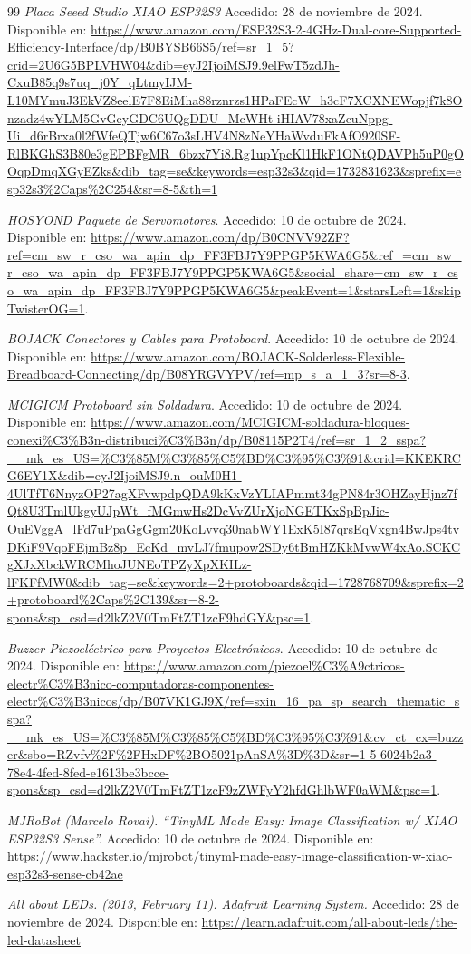 \begin{thebibliography}{99}
    \textit{Placa Seeed Studio XIAO ESP32S3} Accedido: 28 de noviembre de 2024. Disponible en: \url{https://www.amazon.com/ESP32S3-2-4GHz-Dual-core-Supported-Efficiency-Interface/dp/B0BYSB66S5/ref=sr_1_5?crid=2U6G5BPLVHW04&dib=eyJ2IjoiMSJ9.9elFwT5zdJh-CxuB85q9s7uq_j0Y_qLtmyIJM-L10MYmuJ3EkVZ8eelE7F8EiMha88rznrzs1HPaFEcW_h3cF7XCXNEWopjf7k8Onzadz4wYLM5GvGeyGDC6UQgDDU_McWHt-iHIAV78xaZcuNppg-Ui_d6rBrxa0l2fWfeQTjw6C67o3sLHV4N8zNeYHaWvduFkAfO920SF-RlBKGhS3B80e3gEPBFgMR_6bzx7Yi8.Rg1upYpcKl1HkF1ONtQDAVPh5uP0gOOqpDmqXGyEZks&dib_tag=se&keywords=esp32s3&qid=1732831623&sprefix=esp32s3%2Caps%2C254&sr=8-5&th=1}

    \textit{HOSYOND Paquete de Servomotores}. Accedido: 10 de octubre de 2024. Disponible en: \url{https://www.amazon.com/dp/B0CNVV92ZF?ref=cm_sw_r_cso_wa_apin_dp_FF3FBJ7Y9PPGP5KWA6G5&ref_=cm_sw_r_cso_wa_apin_dp_FF3FBJ7Y9PPGP5KWA6G5&social_share=cm_sw_r_cso_wa_apin_dp_FF3FBJ7Y9PPGP5KWA6G5&peakEvent=1&starsLeft=1&skipTwisterOG=1}.

    \textit{BOJACK Conectores y Cables para Protoboard}. Accedido: 10 de octubre de 2024. Disponible en: \url{https://www.amazon.com/BOJACK-Solderless-Flexible-Breadboard-Connecting/dp/B08YRGVYPV/ref=mp_s_a_1_3?sr=8-3}.

    \textit{MCIGICM Protoboard sin Soldadura}. Accedido: 10 de octubre de 2024. Disponible en: \url{https://www.amazon.com/MCIGICM-soldadura-bloques-conexi%C3%B3n-distribuci%C3%B3n/dp/B08115P2T4/ref=sr_1_2_sspa?__mk_es_US=%C3%85M%C3%85%C5%BD%C3%95%C3%91&crid=KKEKRCG6EY1X&dib=eyJ2IjoiMSJ9.n_ouM0H1-4UlTfT6NnyzOP27agXFvwpdpQDA9kKxVzYLIAPmmt34gPN84r3OHZayHjnz7fQt8U3TmlUkgyUJpWt_fMGmwHs2DcVvZUrXjoNGETKxSpBpJic-OuEVggA_lFd7uPpaGgGgm20KoLvvq30nabWY1ExK5I87qrsEqVxgn4BwJps4tvDKiF9VqoFEjmBz8p_EcKd_mvLJ7fmupow2SDy6tBmHZKkMvwW4xAo.SCKCgXJxXbckWRCMhoJUNEoTPZyXpXKILz-lFKFfMW0&dib_tag=se&keywords=2+protoboards&qid=1728768709&sprefix=2+protoboard%2Caps%2C139&sr=8-2-spons&sp_csd=d2lkZ2V0TmFtZT1zcF9hdGY&psc=1}.

    \textit{Buzzer Piezoeléctrico para Proyectos Electrónicos}. Accedido: 10 de octubre de 2024. Disponible en: \url{https://www.amazon.com/piezoel%C3%A9ctricos-electr%C3%B3nico-computadoras-componentes-electr%C3%B3nicos/dp/B07VK1GJ9X/ref=sxin_16_pa_sp_search_thematic_sspa?__mk_es_US=%C3%85M%C3%85%C5%BD%C3%95%C3%91&cv_ct_cx=buzzer&sbo=RZvfv%2F%2FHxDF%2BO5021pAnSA%3D%3D&sr=1-5-6024b2a3-78e4-4fed-8fed-e1613be3bcce-spons&sp_csd=d2lkZ2V0TmFtZT1zcF9zZWFyY2hfdGhlbWF0aWM&psc=1}.

    \textit{MJRoBot (Marcelo Rovai). “TinyML Made Easy: Image Classification w/ XIAO ESP32S3 Sense”.} Accedido: 10 de octubre de 2024. Disponible en: \url{https://www.hackster.io/mjrobot/tinyml-made-easy-image-classification-w-xiao-esp32s3-sense-cb42ae}

    \textit{All about LEDs. (2013, February 11). Adafruit Learning System.} Accedido: 28 de noviembre de 2024. Disponible en: \url{https://learn.adafruit.com/all-about-leds/the-led-datasheet}
    
\end{thebibliography}
